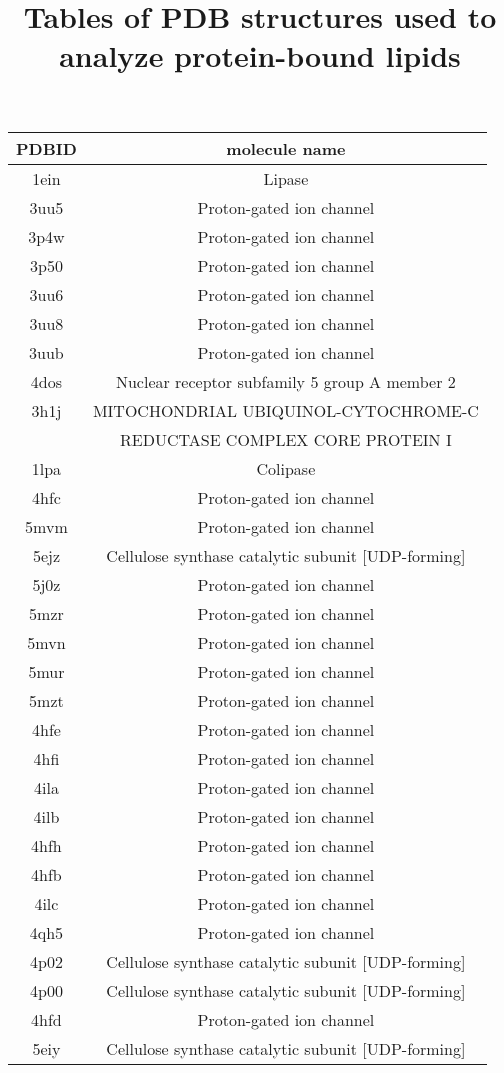 \documentclass{article}
\title{Tables of PDB structures used to analyze protein-bound lipids}
\begin{document}
\begin{table}[]
    \centering
    \begin{tabular}{c|c}
PDBID & molecule name \\
\hline
1ein & Lipase \\ 
3uu5 & Proton-gated ion channel \\ 
3p4w & Proton-gated ion channel \\ 
3p50 & Proton-gated ion channel \\ 
3uu6 & Proton-gated ion channel \\ 
3uu8 & Proton-gated ion channel \\ 
3uub & Proton-gated ion channel \\ 
4dos & Nuclear receptor subfamily 5 group A member 2 \\ 
3h1j & MITOCHONDRIAL UBIQUINOL-CYTOCHROME-C \\
     &REDUCTASE COMPLEX CORE PROTEIN I \\ 
1lpa & Colipase \\ 
4hfc & Proton-gated ion channel \\ 
5mvm & Proton-gated ion channel \\ 
5ejz & Cellulose synthase catalytic subunit [UDP-forming] \\ 
5j0z & Proton-gated ion channel \\ 
5mzr & Proton-gated ion channel \\ 
5mvn & Proton-gated ion channel \\ 
5mur & Proton-gated ion channel \\ 
5mzt & Proton-gated ion channel \\ 
4hfe & Proton-gated ion channel \\ 
4hfi & Proton-gated ion channel \\ 
4ila & Proton-gated ion channel \\ 
4ilb & Proton-gated ion channel \\ 
4hfh & Proton-gated ion channel \\ 
4hfb & Proton-gated ion channel \\ 
4ilc & Proton-gated ion channel \\ 
4qh5 & Proton-gated ion channel \\ 
4p02 & Cellulose synthase catalytic subunit [UDP-forming] \\ 
4p00 & Cellulose synthase catalytic subunit [UDP-forming] \\ 
4hfd & Proton-gated ion channel \\ 
5eiy & Cellulose synthase catalytic subunit [UDP-forming] \\ 

\end{tabular}
\end{table}
\end{document}
